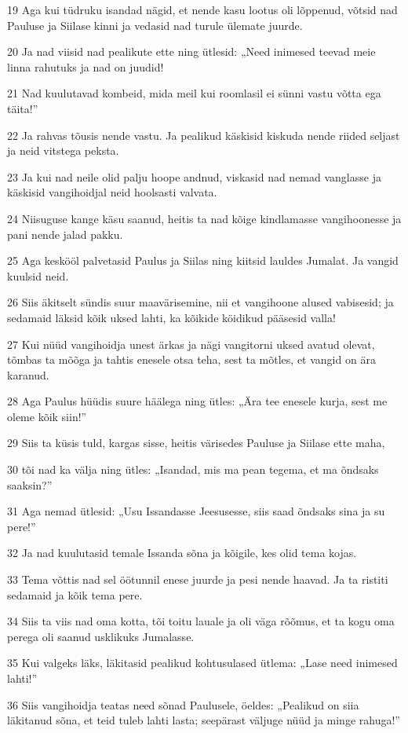 \par 19 Aga kui tüdruku isandad nägid, et nende kasu lootus oli lõppenud, võtsid nad Pauluse ja Siilase kinni ja vedasid nad turule ülemate juurde.
\par 20 Ja nad viisid nad pealikute ette ning ütlesid: „Need inimesed teevad meie linna rahutuks ja nad on juudid!
\par 21 Nad kuulutavad kombeid, mida meil kui roomlasil ei sünni vastu võtta ega täita!”
\par 22 Ja rahvas tõusis nende vastu. Ja pealikud käskisid kiskuda nende riided seljast ja neid vitstega peksta.
\par 23 Ja kui nad neile olid palju hoope andnud, viskasid nad nemad vanglasse ja käskisid vangihoidjal neid hoolsasti valvata.
\par 24 Niisuguse kange käsu saanud, heitis ta nad kõige kindlamasse vangihoonesse ja pani nende jalad pakku.
\par 25 Aga keskööl palvetasid Paulus ja Siilas ning kiitsid lauldes Jumalat. Ja vangid kuulsid neid.
\par 26 Siis äkitselt sündis suur maavärisemine, nii et vangihoone alused vabisesid; ja sedamaid läksid kõik uksed lahti, ka kõikide köidikud pääsesid valla!
\par 27 Kui nüüd vangihoidja unest ärkas ja nägi vangitorni uksed avatud olevat, tõmbas ta mõõga ja tahtis enesele otsa teha, sest ta mõtles, et vangid on ära karanud.
\par 28 Aga Paulus hüüdis suure häälega ning ütles: „Ära tee enesele kurja, sest me oleme kõik siin!”
\par 29 Siis ta küsis tuld, kargas sisse, heitis värisedes Pauluse ja Siilase ette maha,
\par 30 tõi nad ka välja ning ütles: „Isandad, mis ma pean tegema, et ma õndsaks saaksin?”
\par 31 Aga nemad ütlesid: „Usu Issandasse Jeesusesse, siis saad õndsaks sina ja su pere!”
\par 32 Ja nad kuulutasid temale Issanda sõna ja kõigile, kes olid tema kojas.
\par 33 Tema võttis nad sel öötunnil enese juurde ja pesi nende haavad. Ja ta ristiti sedamaid ja kõik tema pere.
\par 34 Siis ta viis nad oma kotta, tõi toitu lauale ja oli väga rõõmus, et ta kogu oma perega oli saanud usklikuks Jumalasse.
\par 35 Kui valgeks läks, läkitasid pealikud kohtusulased ütlema: „Lase need inimesed lahti!”
\par 36 Siis vangihoidja teatas need sõnad Paulusele, öeldes: „Pealikud on siia läkitanud sõna, et teid tuleb lahti lasta; seepärast väljuge nüüd ja minge rahuga!”
